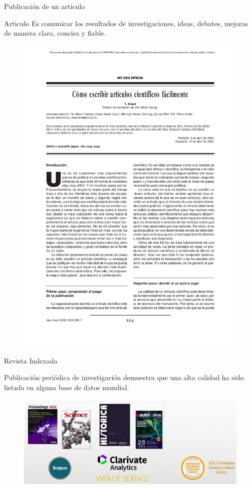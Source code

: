\begin{frame}{Publicación de un articulo}
\begin{block}{Articulo}
Es comunicar los resultados de investigaciones, ideas, debates, mejoras de manera clara, concisa y fiable.
\end{block}  
\begin{figure}[H]
    \includegraphics[scale=0.09]{images/articulo.png}
    \label{fig:boat1}
\end{figure}
\end{frame}


\begin{frame}{Revista Indexada}
\begin{block}{}
Publicación periódica de investigación demuestra que una alta calidad ha sido listada en alguna base de datos mundial.
\end{block}   
\begin{figure}[H]
    \includegraphics[scale=0.4]{images/revistaindexada.png}
    \label{fig:boat1}
\end{figure}
\end{frame}

